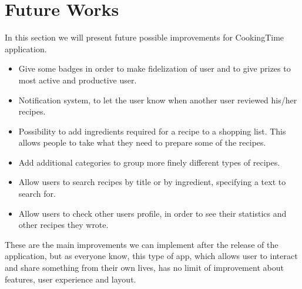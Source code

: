 \chapter{Future Works}
In this section we will present future possible improvements for CookingTime application.
\begin{itemize}
	\item Give some badges in order to make fidelization of user and to give prizes to most active and productive user.
	\item Notification system, to let the user know when another user reviewed his/her recipes. 
	\item Possibility to add ingredients required for a recipe to a shopping list. This allows people to take what they need to prepare some of the recipes.
	\item Add additional categories to group more finely different types of recipes.
	\item Allow users to search recipes by title or by ingredient, specifying a text to search for.
	\item Allow users to check other users profile, in order to see their statistics and other recipes they wrote.
\end{itemize}
These are the main improvements we can implement after the release of the application, but as everyone know, this type of app, which allows user to interact and share something from their own lives, has no limit of improvement about features, user experience and layout.
